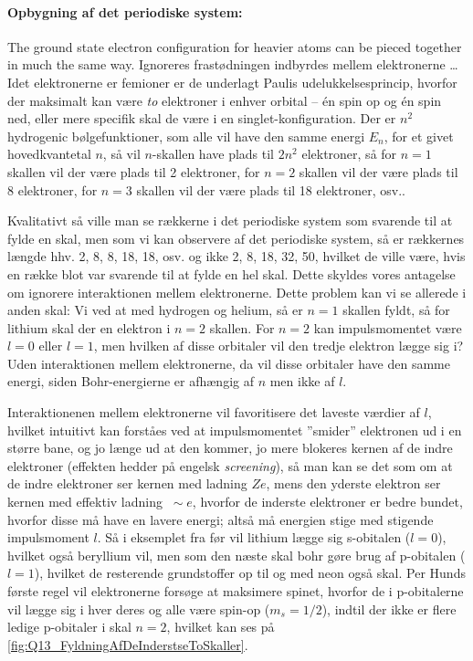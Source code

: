 \paragraph{Opbygning af det periodiske system:} The ground state electron configuration for heavier atoms can be pieced together in much the same way. Ignoreres frastødningen indbyrdes mellem elektronerne \ldots
\noindent
Idet elektronerne er femioner er de underlagt Paulis udelukkelsesprincip, hvorfor der maksimalt kan være \emph{to} elektroner i enhver orbital -- én spin op og én spin ned, eller mere specifik skal de være i en singlet-konfiguration. Der er $n^2$ hydrogenic bølgefunktioner, som alle vil have den samme energi $E_n$, for et givet hovedkvantetal $n$, så vil $n$-skallen have plads til $2n^2$ elektroner, så for $n=1$ skallen vil der være plads til 2 elektroner, for $n=2$ skallen vil der være plads til 8 elektroner, for $n=3$ skallen vil der være plads til 18 elektroner, osv..

Kvalitativt så ville man se rækkerne i det periodiske system som svarende til at fylde en skal, men som vi kan observere af det periodiske system, så er rækkernes længde hhv. 2, 8, 8, 18, 18, osv. og ikke 2, 8, 18, 32, 50, hvilket de ville være, hvis en række blot var svarende til at fylde en hel skal. Dette skyldes vores antagelse om ignorere interaktionen mellem elektronerne. Dette problem kan vi se allerede i anden skal: Vi ved at med hydrogen og helium, så er $n=1$ skallen fyldt, så for lithium skal der en elektron i $n=2$ skallen. For $n=2$ kan impulsmomentet være $l=0$ eller $l=1$, men hvilken af disse orbitaler vil den tredje elektron lægge sig i? Uden interaktionen mellem elektronerne, da vil disse orbitaler have den samme energi, siden Bohr-energierne er afhængig af $n$ men ikke af $l$.

Interaktionenen mellem elektronerne vil favoritisere det laveste værdier af $l$, hvilket intuitivt kan forståes ved at impulsmomentet ''smider'' elektronen ud i en større bane, og jo længe ud at den kommer, jo mere blokeres kernen af de indre elektroner (effekten hedder på engelsk \emph{screening}), så man kan se det som om at de indre elektroner ser kernen med ladning $Ze$, mens den yderste elektron ser kernen med effektiv ladning $\: \sim e$, hvorfor de inderste elektroner er bedre bundet, hvorfor disse må have en lavere energi; altså må energien stige med stigende impulsmoment $l$. Så i eksemplet fra før vil lithium lægge sig s-obitalen ($l=0$), hvilket også beryllium vil, men som den næste skal bohr gøre brug af p-obitalen ($l=1$), hvilket de resterende grundstoffer op til og med neon også skal. Per Hunds første regel vil elektronerne forsøge at maksimere spinet, hvorfor de i p-obitalerne vil lægge sig i hver deres og alle være spin-op ($m_s = 1/2$), indtil der ikke er flere ledige p-obitaler i skal $n=2$, hvilket kan ses på \cref{fig:Q13_FyldningAfDeInderstseToSkaller}.

